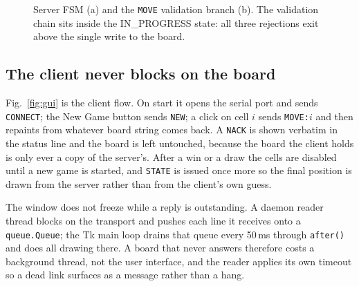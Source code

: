 \begin{figure}[t]
\caption{Server FSM (a) and the \texttt{MOVE} validation branch (b). The
validation chain sits inside the IN\_PROGRESS state: all three rejections exit
above the single write to the board.}
\label{fig:fsm}
\end{figure}

\subsection{The client never blocks on the board}
Fig.~\ref{fig:gui} is the client flow. On start it opens the serial port and
sends \texttt{CONNECT}; the New Game button sends \texttt{NEW}; a click on cell
$i$ sends \texttt{MOVE:}$i$ and then repaints from whatever board string comes
back. A \texttt{NACK} is shown verbatim in the status line and the board is left
untouched, because the board the client holds is only ever a copy of the
server's. After a win or a draw the cells are disabled until a new game is
started, and \texttt{STATE} is issued once more so the final position is drawn
from the server rather than from the client's own guess.

The window does not freeze while a reply is outstanding. A daemon reader thread
blocks on the transport and pushes each line it receives onto a
\texttt{queue.Queue}; the Tk main loop drains that queue every 50\,ms through
\texttt{after()} and does all drawing there. A board that never answers
therefore costs a background thread, not the user interface, and the reader
applies its own timeout so a dead link surfaces as a message rather than a hang.

